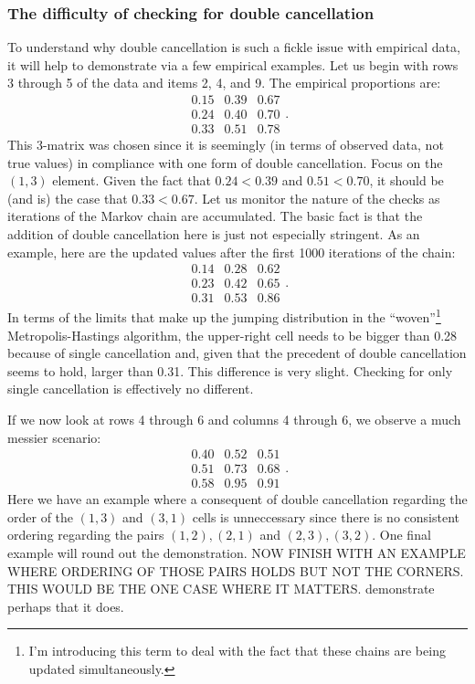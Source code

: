 \documentclass[12pt]{article}
\begin{document}
\subsubsection{The difficulty of checking for double cancellation}
To understand why double cancellation is such a fickle issue with empirical data, it will help to demonstrate via a few empirical examples. Let us begin with rows 3 through 5 of the  data and items 2, 4, and 9. The empirical proportions are:
\[
\begin{array}{ccc}
0.15& 0.39& 0.67 \\
0.24 &0.40 &0.70 \\
 0.33& 0.51& 0.78 
\end{array}.
\]
This 3-matrix was chosen since it is seemingly (in terms of observed data, not true values) in compliance with one form of double cancellation. Focus on the $(1,3)$ element. Given the fact that $0.24<0.39$ and $0.51<0.70$, it should be (and is) the case that $0.33<0.67$. Let us monitor the nature of the checks as iterations of the Markov chain are accumulated. The basic fact is that the addition of double cancellation here is just not especially stringent. As an example, here are the updated values after the first 1000 iterations of the chain:
\[
\begin{array}{ccc}
0.14 &0.28& 0.62 \\
 0.23& 0.42& 0.65 \\
 0.31& 0.53& 0.86
\end{array}.
\]
In terms of the limits that make up the jumping distribution in the ``woven''\footnote{I'm introducing this term to deal with the fact that these chains are being updated simultaneously.} Metropolis-Hastings algorithm, the upper-right cell needs to be bigger than 0.28 because of single cancellation and, given that the precedent of double cancellation seems to hold, larger than 0.31. This difference is very slight. Checking for only single cancellation is effectively no different.

If we now look at rows 4 through 6 and columns 4 through 6, we observe a much messier scenario:
\[
\begin{array}{ccc}
 0.40& 0.52& 0.51 \\
 0.51& 0.73& 0.68 \\
 0.58& 0.95& 0.91
\end{array}.
\]
Here we have an example where a consequent of double cancellation regarding the order of the $(1,3)$ and $(3,1)$ cells is unneccessary since there is no consistent ordering regarding the pairs $(1,2),(2,1)$ and $(2,3), (3,2)$. One final example will round out the demonstration. NOW FINISH WITH AN EXAMPLE WHERE  ORDERING OF THOSE PAIRS HOLDS BUT NOT THE CORNERS. THIS WOULD BE THE ONE CASE WHERE IT MATTERS. demonstrate perhaps that it does. 
\end{document}
